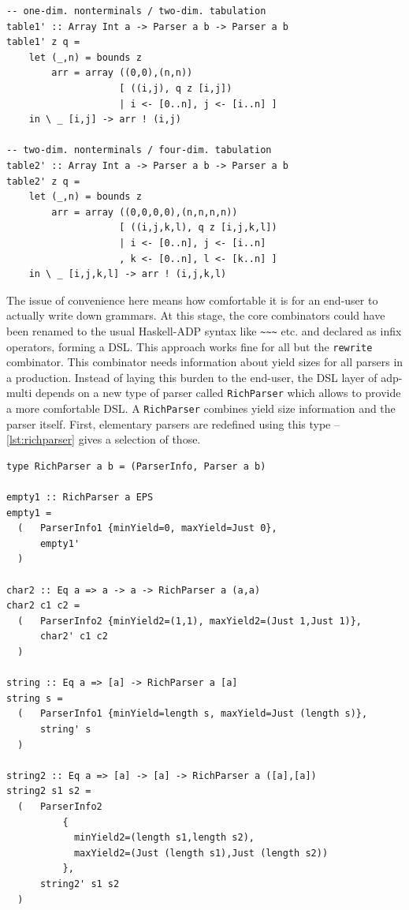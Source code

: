 \documentclass[
    a4paper,
    12pt,
    twoside,
    BCOR=12mm,
    parskip=half,
    chapterprefix,
    numbers=noenddot,
    bibliography=totoc
]{scrbook}
\begin{document}
\begin{lstlisting}[label=lst:memoizing,caption=Memoizing combinators]
-- one-dim. nonterminals / two-dim. tabulation
table1' :: Array Int a -> Parser a b -> Parser a b
table1' z q = 
    let (_,n) = bounds z
        arr = array ((0,0),(n,n))
                    [ ((i,j), q z [i,j])
                    | i <- [0..n], j <- [i..n] ]
    in \ _ [i,j] -> arr ! (i,j)

-- two-dim. nonterminals / four-dim. tabulation
table2' :: Array Int a -> Parser a b -> Parser a b
table2' z q =
    let (_,n) = bounds z
        arr = array ((0,0,0,0),(n,n,n,n))
                    [ ((i,j,k,l), q z [i,j,k,l])
                    | i <- [0..n], j <- [i..n]
                    , k <- [0..n], l <- [k..n] ]
    in \ _ [i,j,k,l] -> arr ! (i,j,k,l)
\end{lstlisting}

The issue of convenience here means how comfortable it is for an end-user to actually write down grammars. At this stage, the core combinators could have been renamed to the usual Haskell-ADP syntax like \verb|~~~| etc. and declared as infix operators, forming a \gls{DSL}. This approach works fine for all but the \verb|rewrite| combinator. This combinator needs information about yield sizes for all parsers in a production. Instead of laying this burden to the end-user, the \gls{DSL} layer of adp-multi depends on a new type of parser called \verb|RichParser| which allows to provide a more comfortable \gls{DSL}. A \verb|RichParser| combines yield size information and the parser itself. First, elementary parsers are redefined using this type -- \cref{lst:richparser} gives a selection of those.

\begin{lstlisting}[label=lst:richparser,caption=Elementary parsers with yield size information]
type RichParser a b = (ParserInfo, Parser a b)

empty1 :: RichParser a EPS
empty1 = 
  (   ParserInfo1 {minYield=0, maxYield=Just 0},
      empty1'
  )
				
char2 :: Eq a => a -> a -> RichParser a (a,a)
char2 c1 c2 = 
  (   ParserInfo2 {minYield2=(1,1), maxYield2=(Just 1,Just 1)},
      char2' c1 c2
  )
							
string :: Eq a => [a] -> RichParser a [a]
string s = 
  (   ParserInfo1 {minYield=length s, maxYield=Just (length s)},
      string' s
  )
		
string2 :: Eq a => [a] -> [a] -> RichParser a ([a],[a])
string2 s1 s2 = 
  (   ParserInfo2 
          {
            minYield2=(length s1,length s2),
            maxYield2=(Just (length s1),Just (length s2))
          },
      string2' s1 s2
  ) 
\end{lstlisting}
\end{document}
